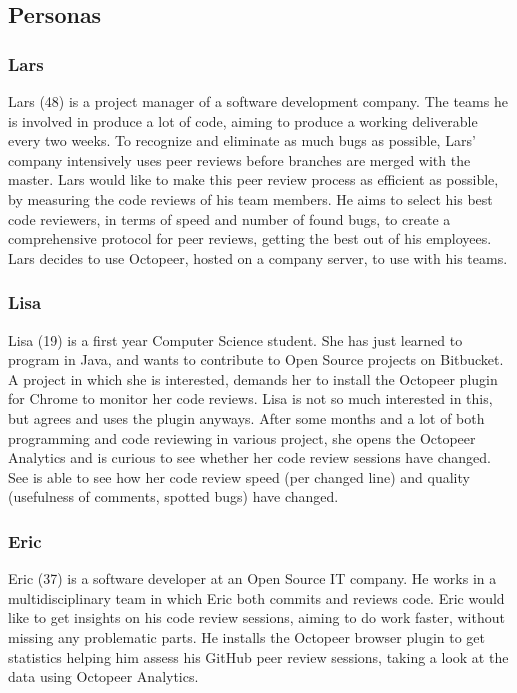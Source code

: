 \documentclass{article}
\begin{document}
\subsection{Personas} \label{section:personas}
\subsubsection{Lars}  \label{persona:lars}
Lars (48) is a project manager of a software development company. The teams he is involved in produce a lot of code, aiming to produce a working deliverable every two weeks. To recognize and eliminate as much bugs as possible, Lars' company intensively uses peer reviews before branches are merged with the master. Lars would like to make this peer review process as efficient as possible, by measuring the code reviews of his team members. He aims to select his best code reviewers, in terms of speed and number of found bugs, to create a comprehensive protocol for peer reviews, getting the best out of his employees. Lars decides to use Octopeer, hosted on a company server, to use with his teams.

\subsubsection{Lisa}
Lisa (19) is a first year Computer Science student. She has just learned to program in Java, and wants to contribute to Open Source projects on Bitbucket. A project in which she is interested, demands her to install the Octopeer plugin for Chrome to monitor her code reviews. Lisa is not so much interested in this, but agrees and uses the plugin anyways. After some months and a lot of both programming and code reviewing in various project, she opens the Octopeer Analytics and is curious to see whether her code review sessions have changed. See is able to see how her code review speed (per changed line) and quality (usefulness of comments, spotted bugs) have changed.

\subsubsection{Eric}
Eric (37) is a software developer at an Open Source IT company. He works in a multidisciplinary team in which Eric both commits and reviews code. Eric would like to get insights on his code review sessions, aiming to do work faster, without missing any problematic parts. He installs the Octopeer browser plugin to get statistics helping him assess his GitHub peer review sessions, taking a look at the data using Octopeer Analytics.
\end{document}
